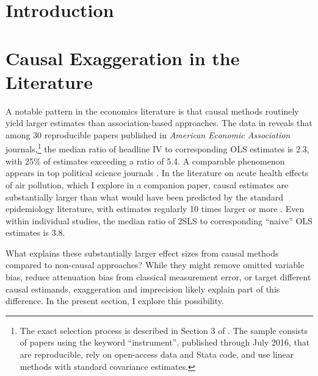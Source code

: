 \documentclass[usletter, 12pt]{article}
\begin{document}

	
	\section{Introduction}
	
		
	



	\section{Causal Exaggeration in the Literature}\label{lit_review}
		
		A notable pattern in the economics literature is that causal methods routinely yield larger estimates than association-based approaches. The data in \cite{young_consistency_2022} reveals that among 30 reproducible papers published in \textit{American Economic Association} journals,\footnote{The exact selection process is described in Section 3 of \cite{young_consistency_2022}. The sample consists of papers using the keyword ``instrument'', published through July 2016, that are reproducible, rely on open-access data and Stata code, and use linear methods with standard covariance estimates.} the median ratio of headline IV to corresponding OLS estimates is 2.3, with 25\% of estimates exceeding a ratio of 5.4. A comparable phenomenon appears in top political science journals \citep{lalHow2024}. In the literature on acute health effects of air pollution, which I explore in a companion paper, causal estimates are substantially larger than what would have been predicted by the standard epidemiology literature, with estimates regularly 10 times larger or more \citep{bagilet_accurate_2023}. Even within individual studies, the median ratio of 2SLS to corresponding ``naive'' OLS estimates is 3.8. 
		
		What explains these substantially larger effect sizes from causal methods compared to non-causal approaches? While they might remove omitted variable bias, reduce attenuation bias from classical measurement error, or target different causal estimands, exaggeration and imprecision likely explain part of this difference. In the present section, I explore this possibility. %
		
\end{document}
